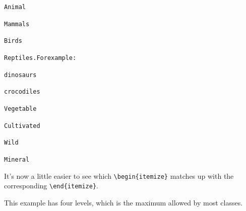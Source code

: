 \begin{code}
\begin{alltt}

    Animal


       Mammals

       Birds

       Reptiles. For example:


          dinosaurs

          crocodiles



    Vegetable


       Cultivated

       Wild


    Mineral

\end{alltt}
\end{code}

It's now a little easier to see which \verb|\begin{itemize}| matches
up with the corresponding \verb|\end{itemize}|.


This example has four levels, which is the maximum allowed by most
classes.

